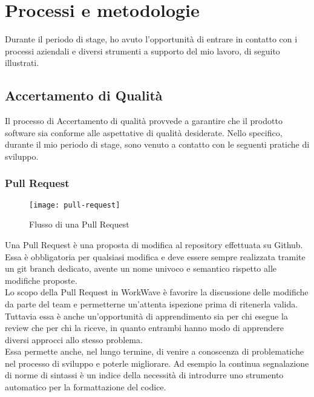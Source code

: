 
\chapter{Processi e metodologie}
\label{cap:processi-metodologie}

Durante il periodo di stage, ho avuto l'opportunità di entrare in contatto con i processi aziendali e diversi strumenti a supporto del mio lavoro, di seguito illustrati.

\section{Accertamento di Qualità}

Il processo di Accertamento di qualità provvede a garantire che il prodotto software sia conforme alle aspettative di qualità desiderate. Nello specifico, durante il mio periodo di stage, sono venuto a contatto con le seguenti pratiche di sviluppo.

\subsection{Pull Request}

\begin{figure}[H] 
  \centering 
  \texttt{[image: pull-request]} 
  \caption{Flusso di una Pull Request}
\end{figure}

Una Pull Request è una proposta di modifica al repository effettuata su Github. Essa è obbligatoria per qualsiasi modifica e deve essere sempre realizzata tramite un git branch dedicato, avente un nome univoco e semantico rispetto alle modifiche proposte. \\

Lo scopo della Pull Request in WorkWave è favorire la discussione delle modifiche da parte del team e permetterne un'attenta ispezione prima di ritenerla valida. Tuttavia essa è anche un'opportunità di apprendimento sia per chi esegue la review che per chi la riceve, in quanto entrambi hanno modo di apprendere diversi approcci allo stesso problema. \\

Essa permette anche, nel lungo termine, di venire a conoscenza di problematiche nel processo di sviluppo e poterle migliorare. Ad esempio la continua segnalazione di norme di sintassi è un indice della necessità di introdurre uno strumento automatico per la formattazione del codice.

